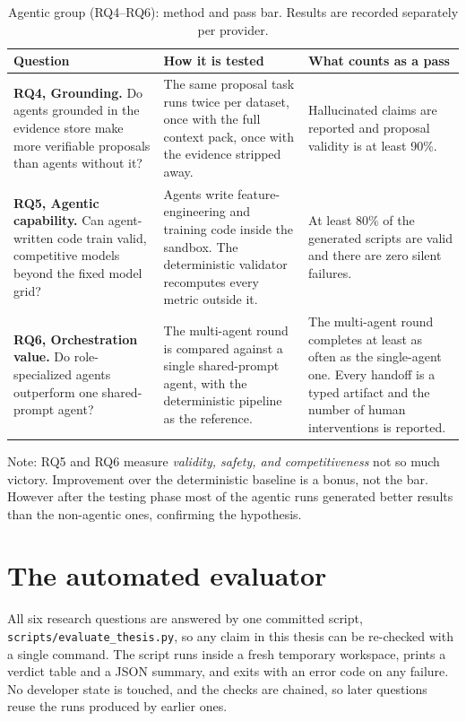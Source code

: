 \begin{table}[H]
\centering
\caption{Agentic group (RQ4--RQ6): method and pass bar. Results are recorded separately per provider.}
\label{tab:rq-agentic}
\footnotesize
\begin{tabular}{>{\raggedright\arraybackslash}p{3.4cm}>{\raggedright\arraybackslash}p{5.2cm}>{\raggedright\arraybackslash}p{5.2cm}}
\toprule
\textbf{Question} & \textbf{How it is tested} & \textbf{What counts as a pass} \\
\midrule
\textbf{RQ4, Grounding.} Do agents grounded in the evidence store make more verifiable proposals than agents without it? &
The same proposal task runs twice per dataset, once with the full context pack, once with the evidence stripped away. &
Hallucinated claims are reported and proposal validity is at least 90\%. \\
\addlinespace
\textbf{RQ5, Agentic capability.} Can agent-written code train valid, competitive models beyond the fixed model grid? &
Agents write feature-engineering and training code inside the sandbox. The deterministic validator recomputes every metric outside it. &
At least 80\% of the generated scripts are valid and there are zero silent failures. \\
\addlinespace
\textbf{RQ6, Orchestration value.} Do role-specialized agents outperform one shared-prompt agent? &
The multi-agent round is compared against a single shared-prompt agent, with the deterministic pipeline as the reference. &
The multi-agent round completes at least as often as the single-agent one. Every handoff is a typed artifact and the number of human interventions is reported. \\
\bottomrule
\end{tabular}
\end{table}
Note: RQ5 and RQ6 measure \emph{validity, safety, and competitiveness} not so much victory. Improvement over the deterministic baseline is a bonus, not the bar. However after the testing phase most of the agentic runs generated better results than the non-agentic ones, confirming the hypothesis.

\section{The automated evaluator}
\label{sec:evaluator}

All six research questions are answered by one committed script, \texttt{scripts/evaluate\_thesis.py}, so any claim in this thesis can be re-checked with a single command. The script runs inside a fresh temporary workspace, prints a verdict table and a JSON summary, and exits with an error code on any failure. No developer state is touched, and the checks are chained, so later questions reuse the runs produced by earlier ones.

